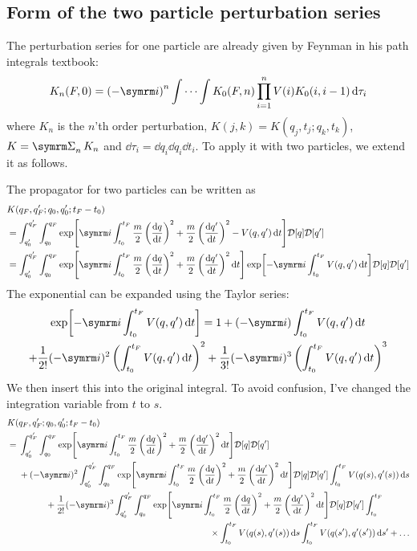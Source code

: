 \subsection{Form of the two particle perturbation series}

The perturbation series for one particle are already given by Feynman in his path integrals textbook:
\begin{equation}
    K_n(F, 0) = \left(-\im\right)^n\idotsint K_0(F, n)\prod_{i = 1}^n V(i)K_0(i, i - 1)\dd{\tau_i}
\end{equation}
where $K_n$ is the $n$'th order perturbation, $K(j, k) = K(q_j, t_j; q_k, t_k)$, $K = \ssum_nK_n$ and $\dd{\tau_i} = \dd{q_i}\dd{q_i}\dd{t_i}$. To apply it with two particles, we extend it as follows.

The propagator for two particles can be written as
\begin{align}
    &K(q_F, q_F'; q_0, q_0'; t_F - t_0) \nonumber\\
    &= \int_{q_0'}^{q_F'}\int_{q_0}^{q_F}\exp[\im\int_{t_0}^{t_F}\frac{m}{2}\left(\dv{q}{t}\right)^2 + \frac{m}{2}\left(\dv{q'}{t}\right)^2 - V(q, q')\dd{t}]\pintm{q}\pintm{q'} \\
    &= \int_{q_0'}^{q_F'}\int_{q_0}^{q_F}\exp[\im\int_{t_0}^{t_F}\frac{m}{2}\left(\dv{q}{t}\right)^2 + \frac{m}{2}\left(\dv{q'}{t}\right)^2\dd{t}]\exp[-\im\int_{t_0}^{t_F}V(q, q')\dd{t}]\pintm{q}\pintm{q'}
\end{align}
The exponential can be expanded using the Taylor series:
\begin{multline}
    \exp[-\im\int_{t_0}^{t_F}V(q, q')\dd{t}] = 1 + (-\im)\int_{t_0}^{t_F}V(q, q')\dd{t} \\+ \frac{1}{2!}(-\im)^2\left(\int_{t_0}^{t_F}V(q, q')\dd{t}\right)^2 + \frac{1}{3!}(-\im)^3\left(\int_{t_0}^{t_F}V(q, q')\dd{t}\right)^3
\end{multline}
We then insert this into the original integral. To avoid confusion, I've changed the integration variable from $t$ to $s$.
\begin{align}
    &K(q_F, q_F'; q_0, q_0'; t_F - t_0) \\
    &= \begin{multlined}[t]
        \int_{q_0'}^{q_F'}\int_{q_0}^{q_F}\exp[\im\int_{t_0}^{t_F}\frac{m}{2}\left(\dv{q}{t}\right)^2 + \frac{m}{2}\left(\dv{q'}{t}\right)^2\dd{t}]\pintm{q}\pintm{q'} \\
        + (-\im)^2\int_{q_0'}^{q_F'}\int_{q_0}^{q_F}\exp[\im\int_{t_0}^{t_F}\frac{m}{2}\left(\dv{q}{t}\right)^2 + \frac{m}{2}\left(\dv{q'}{t}\right)^2\dd{t}]\pintm{q}\pintm{q'}\int_{t_0}^{t_F}V(q(s), q'(s))\dd{s} \\
        + \frac{1}{2!}(-\im)^3\int_{q_0'}^{q_F'}\int_{q_0}^{q_F}\exp[\im\int_{t_0}^{t_F}\frac{m}{2}\left(\dv{q}{t}\right)^2 + \frac{m}{2}\left(\dv{q'}{t}\right)^2\dd{t}]\pintm{q}\pintm{q'}\int_{t_0}^{t_F} \\
        \times \int_{t_0}^{t_F}V(q(s), q'(s))\dd{s}\int_{t_0}^{t_F}V(q(s'), q'(s'))\dd{s'} + \dots
    \end{multlined}
\end{align}
